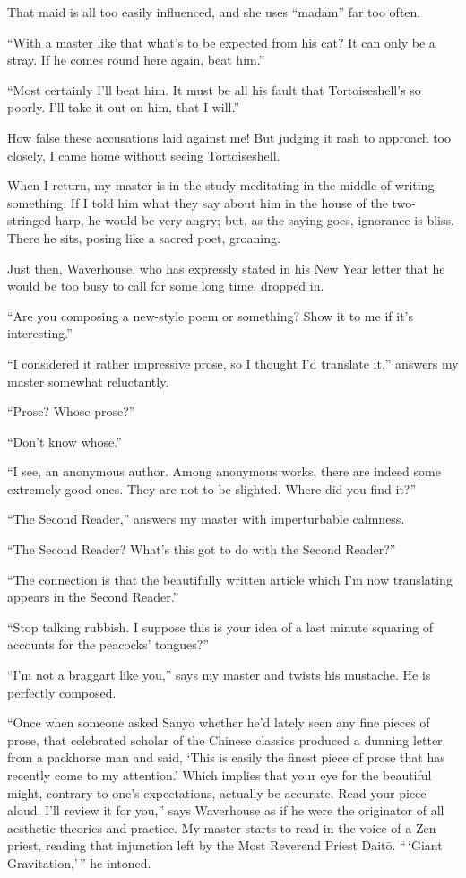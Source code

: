 \documentclass{book}
\begin{document}
That maid is all too easily influenced, and she uses ``madam'' far too
often.

``With a master like that what's to be expected from his cat? It can
only be a stray. If he comes round here again, beat him.''

``Most certainly I'll beat him. It must be all his fault that
Tortoiseshell's so poorly. I'll take it out on him, that I will.''

How false these accusations laid against me! But judging it rash to
approach too closely, I came home without seeing Tortoiseshell.

When I return, my master is in the study meditating in the middle of
writing something. If I told him what they say about him in the house of
the two-stringed harp, he would be very angry; but, as the saying goes,
ignorance is bliss. There he sits, posing like a sacred poet, groaning.

Just then, Waverhouse, who has expressly stated in his New Year letter
that he would be too busy to call for some long time, dropped in.

``Are you composing a new-style poem or something? Show it to me if it's
interesting.''

``I considered it rather impressive prose, so I thought I'd translate
it,'' answers my master somewhat reluctantly.

``Prose? Whose prose?''

``Don't know whose.''

``I see, an anonymous author. Among anonymous works, there are indeed
some extremely good ones. They are not to be slighted. Where did you
find it?''

``The Second Reader,'' answers my master with imperturbable calmness.

``The Second Reader? What's this got to do with the Second Reader?''

``The connection is that the beautifully written article which I'm now
translating appears in the Second Reader.''

``Stop talking rubbish. I suppose this is your idea of a last minute
squaring of accounts for the peacocks' tongues?''

``I'm not a braggart like you,'' says my master and twists his mustache.
He is perfectly composed.

``Once when someone asked Sanyo whether he'd lately seen any fine pieces
of prose, that celebrated scholar of the Chinese classics produced a
dunning letter from a packhorse man and said, `This is easily the finest
piece of prose that has recently come to my attention.' Which implies
that your eye for the beautiful might, contrary to one's expectations,
actually be accurate. Read your piece aloud. I'll review it for you,''
says Waverhouse as if he were the originator of all aesthetic theories
and practice. My master starts to read in the voice of a Zen priest,
reading that injunction left by the Most Reverend Priest Daitō.
``\,`Giant Gravitation,'\,'' he intoned.
\end{document}
